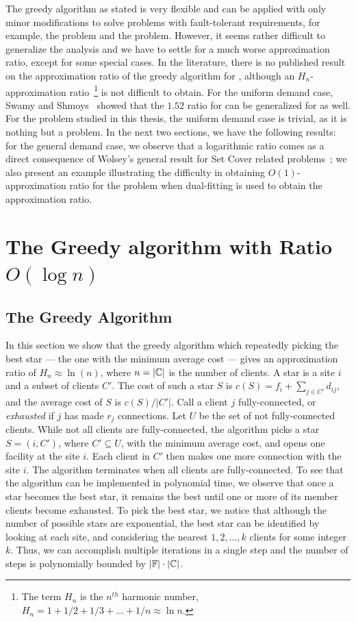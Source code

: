 \documentclass[oneside,final]{ucr}
\begin{document}
The greedy algorithm as stated is very flexible and can be
applied with only minor modifications to solve problems with
fault-tolerant requirements, for example, the {\FTFL}
problem and the {\FTFP} problem. However, it seems rather
difficult to generalize the analysis and we have to settle
for a much worse approximation ratio, except for some
special cases. In the literature, there is no published
result on the approximation ratio of the greedy algorithm
for {\FTFL}, although an $H_n$-approximation
ratio~\footnote{The term $H_n$ is the $n^{th}$ harmonic
  number, $H_n = 1 + 1/2 + 1/3 + \ldots + 1/n \approx \ln
  n$.} is not difficult to obtain. For the uniform demand
case, Swamy and Shmoys~\cite{SwamyS08} showed that the
$1.52$ ratio for {\UFL} can be generalized for {\FTFL} as
well. For the {\FTFP} problem studied in this thesis, the
uniform demand case is trivial, as it is nothing but a
{\UFL} problem. In the next two sections, we have the
following results: for the general demand case, we observe
that a logarithmic ratio comes as a direct consequence of
Wolsey's general result for Set Cover related
problems~\cite{Wolsey88}; we also present an example
illustrating the difficulty in obtaining
$O(1)$-approximation ratio for the {\FTFP} problem when
dual-fitting is used to obtain the approximation ratio.

\section{The Greedy algorithm with Ratio $O(\log n)$}
\label{sec: greedy_ratio}

\subsection{The Greedy Algorithm}
In this section we show that the greedy algorithm which
repeatedly picking the best star --- the one with the
minimum average cost --- gives an approximation ratio of
$H_n \approx \ln(n)$, where $n=|\mathbb{C}|$ is the number
of clients. A star is a site $i$ and a subset of clients
$C'$. The cost of such a star $S$ is $c(S) = f_i +
\sum_{j\in C'} d_{ij}$, and the average cost of $S$ is $c(S)
/ |C'|$. Call a client $j$ fully-connected, or
\emph{exhausted} if $j$ has made $r_j$ connections. Let $U$
be the set of not fully-connected clients. While not all
clients are fully-connected, the algorithm picks a star
$S=(i,C')$, where $C' \subseteq U$, with the minimum average
cost, and opens one facility at the site $i$. Each client in
$C'$ then makes one more connection with the site $i$. The
algorithm terminates when all clients are
fully-connected. To see that the algorithm can be
implemented in polynomial time, we observe that once a star
becomes the best star, it remains the best until one or more
of its member clients become exhausted. To pick the best
star, we notice that although the number of possible stars
are exponential, the best star can be identified by looking
at each site, and considering the nearest $1,2,\ldots,k$
clients for some integer $k$. Thus, we can accomplish
multiple iterations in a single step and the number of steps
is polynomially bounded by $|\mathbb{F}|\cdot|\mathbb{C}|$.
\end{document}
